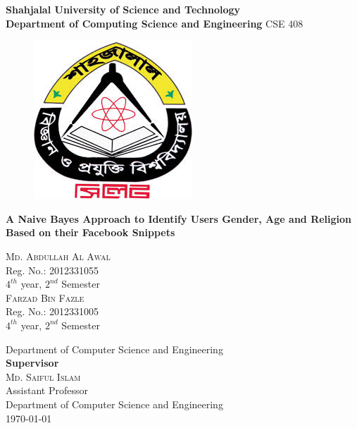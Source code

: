\documentclass{standalone}
\begin{document}
\begin{titlepage}

\begin{center}
				{\huge \bf Shahjalal University of Science and Technology}\\
				{\LARGE \bf Department of Computing Science and Engineering}
				\vfill
				{\Large CSE 408}\\
        \begin{figure}[h]
				\centering
				\vfill
				\includegraphics[scale=0.6]{./img/varsityLogo}
				\end{figure}

				\vfill
				
				{\LARGE \bf A Naive Bayes Approach to Identify Users Gender, Age and Religion Based on their Facebook Snippets}\\
        \begin{multicols}{2}
        \textsc{\Large Md. Abdullah Al Awal }\\
        Reg. No.: 2012331055\\ $4^{th}$ year, $2^{nd}$ Semester\\
				\textsc{\Large Farzad Bin Fazle} \\
        Reg. No.: 2012331005\\ $4^{th}$ year, $2^{nd}$ Semester
				\end{multicols}
				Department of Computer Science and Engineering\\
				\vfill
        {\bf Supervisor}\\
				\textsc{\Large Md. Saiful Islam} \\
        Assistant Professor\\ 
				Department of Computer Science and Engineering\\
        \vfill
        \today
        

\end{center}
\end{titlepage}
\end{document}
